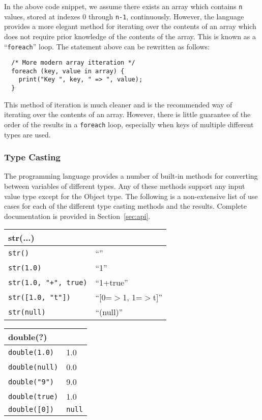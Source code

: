 In the above code snippet, we assume there exists an array which contains
{\tt n} values, stored at indexes 0 through {\tt n-1}, continuously. However, 
the language provides a more elegant method for iterating over the contents 
of an array which does not require prior knowledge of the contents of the array. 
This is known as a ``{\tt foreach}'' loop. The statement above can be rewritten 
as follows:

\lstset{language=C++}
\begin{lstlisting}  
  /* More modern array itteration */
  foreach (key, value in array) {
    print("Key ", key, " => ", value);
  } 
\end{lstlisting}

This method of iteration is much cleaner and is the recommended way of
iterating over the contents of an array. However, there is little guarantee
of the order of the results in a {\tt foreach} loop, especially when keys
of multiple different types are used.

\subsubsection{Type Casting}

The \ModLang programming language provides a number of built-in methods for
converting between variables of different types. Any of these methods support
any input value type except for the Object type. The following is a non-extensive
list of use cases for each of the different type casting methods and the
results. Complete documentation is provided in Section~\ref{sec:api}.

\begin{multicols}{2}
  \begin{center}
    \begin{tabular}{|p{1.5in}|p{1.2in}|}
      \hline
      \multicolumn{2}{|l|}{\textbf{str(...)}}\\
      \hline
      {\tt str()} & ``'' \\
      {\tt str(1.0)} & ``1'' \\
      {\tt str(1.0, "+", true)} & ``1+true'' \\
      {\tt str([1.0, "t"])} & ``[0=$>$1, 1=$>$t]''\\
      {\tt str(null)} & ``(null)''\\
      \hline
    \end{tabular}
  \end{center}
  \begin{center}
    \begin{tabular}{|p{1.5in}|p{1.2in}|}
      \hline
      \multicolumn{2}{|l|}{\textbf{double(?)}}\\
      \hline
      {\tt double(1.0)} & 1.0\\
      {\tt double(null)}& 0.0\\
      {\tt double("9")} & 9.0\\
      {\tt double(true)}& 1.0\\
      {\tt double([0])} & {\tt null}\\
      \hline
    \end{tabular}
  \end{center}
\end{multicols}

